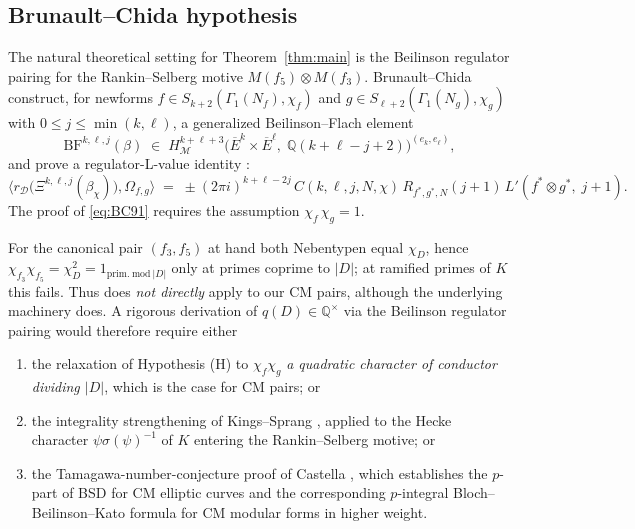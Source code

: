 \documentclass[11pt,a4paper]{amsart}
\theoremstyle{plain}
\theoremstyle{definition}
\newcommand{\Q}{\mathbb{Q}}
\begin{document}
\subsection{Brunault--Chida hypothesis}

The natural theoretical setting for Theorem~\ref{thm:main} is the
Beilinson regulator pairing for the Rankin--Selberg motive
$M(f_5)\otimes M(f_3)$. Brunault--Chida \cite[\S3-\S4]{BrunaultChida2015}
construct, for newforms $f\in S_{k+2}(\Gamma_1(N_f),\chi_f)$ and
$g\in S_{\ell+2}(\Gamma_1(N_g),\chi_g)$ with $0\le j\le \min(k,\ell)$, a
generalized Beilinson--Flach element
\[
  \mathrm{BF}^{k,\ell,j}(\beta) \;\in\;
   H^{k+\ell+3}_{\mathcal M}\!\bigl(
     \overline{E}^{k}\!\times\overline{E}^{\ell},\;\Q(k+\ell-j+2)
   \bigr)^{(e_k,e_\ell)},
\]
and prove a regulator-L-value identity \cite[Thm.~9.1]{BrunaultChida2015}:
\begin{equation}
\label{eq:BC91}
  \bigl\langle r_{\mathcal D}\bigl(\Xi^{k,\ell,j}(\beta_\chi)\bigr),
   \Omega_{f,g}\bigr\rangle
  \;=\; \pm(2\pi i)^{k+\ell-2j} \,C(k,\ell,j,N,\chi)
   \,R_{f^*\!,g^*\!,N}(j+1)\,L'(f^*\!\otimes g^*,\;j+1).
\end{equation}
The proof of \eqref{eq:BC91} requires \cite[Hypothesis (H)]{BrunaultChida2015}
the assumption $\chi_f\,\chi_g=1$.

For the canonical pair $(f_3,f_5)$ at hand both Nebentypen equal
$\chi_D$, hence
$\chi_{f_3}\chi_{f_5}=\chi_D^{2}=1_{\mathrm{prim.\ mod\ }|D|}$ only at
primes coprime to $|D|$; at ramified primes of $K$ this fails. Thus
\cite[Thm.~9.1]{BrunaultChida2015} does \emph{not directly} apply to our
CM pairs, although the underlying machinery does. A rigorous derivation
of $q(D)\in\Q^{\times}$ via the Beilinson regulator pairing would
therefore require either

\begin{enumerate}\setlength\itemsep{0.4ex}
\item the relaxation of Hypothesis (H) to $\chi_f\chi_g$ \emph{a
quadratic character of conductor dividing $|D|$}, which is the case for
CM pairs; or
\item the integrality strengthening of Kings--Sprang
\cite[Thm.~A]{KingsSprang2025}, applied to the Hecke character
$\psi\sigma(\psi)^{-1}$ of $K$ entering the Rankin--Selberg motive; or
\item the Tamagawa-number-conjecture proof of Castella
\cite[Thm.~B]{Castella2025}, which establishes the $p$-part of BSD for
CM elliptic curves and the corresponding $p$-integral
Bloch--Beilinson--Kato formula for CM modular forms in higher weight.
\end{enumerate}
\end{document}
